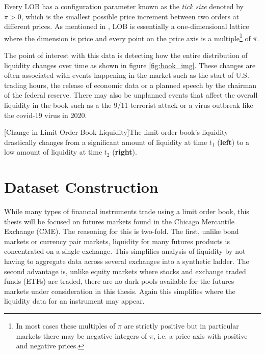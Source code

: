 Every LOB has a configuration parameter known as the \textit{tick size} denoted by $\pi >0$, which is the smallest possible price increment between two orders at different prices. As mentioned in \cite{gould2016queue}, LOB is essentially a one-dimensional lattice where the dimension is price and every point on the price axis is a multiple\footnote{In most cases these multiples of $\pi$ are strictly positive but in particular markets there may be negative integers of $\pi$, i.e. a price axis with positive and negative prices.} of $\pi$.

The point of interest with this data is detecting how the entire distribution of liquidity changes over time as shown in figure \ref{fig:book_img}. These changes are often associated with events happening in the market such as the start of U.S. trading hours, the release of economic data or a planned speech by the chairman of the federal reserve. There may also be unplanned events that affect the overall liquidity in the book such as a the 9/11 terrorist attack or a virus outbreak like the covid-19 virus in 2020.

\begin{minipage}{0.96\textwidth}
\begin{center} 
[Change in Limit Order Book Liquidity]{The limit order book's liquidity drastically changes from a significant amount of liquidity at time $t_1$  (\textbf{left}) to a low amount of liquidity at time $t_2$ (\textbf{right}).} 
\label{fig:book_img} 
\end{center}
\end{minipage}



\section{Dataset Construction}
\label{liq_data_construction}
While many types of financial instruments trade using a limit order book, this thesis will be focused on futures markets found in the Chicago Mercantile Exchange (CME). The reasoning for this is two-fold. The first, unlike bond markets or currency pair markets, liquidity for many futures products is concentrated on a single exchange. This simplifies analysis of liquidity by not having to aggregate data across several exchanges into a synthetic ladder. The second advantage is, unlike equity markets where stocks and exchange traded funds (ETFs) are traded, there are no dark pools available for the futures markets under consideration in this thesis. Again this simplifies where the liquidity data for an instrument may appear.

